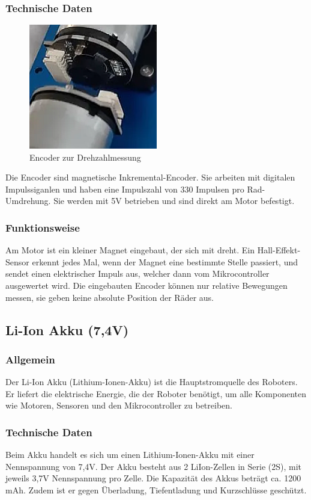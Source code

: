 \subsubsection{Technische Daten}
\begin{figure}[H]
    \centering
    \includegraphics[width=0.5\textwidth]{img/Hardware/encoder.png}
    \caption{Encoder zur Drehzahlmessung}
    \label{fig:encoder}
\end{figure}
Die Encoder sind magnetische Inkremental-Encoder.
Sie arbeiten mit digitalen Impulssiganlen und haben eine Impulszahl von 330 Impulsen pro Rad-Umdrehung.
%
Sie werden mit 5V betrieben und sind direkt am Motor befestigt.
\subsubsection{Funktionsweise}
Am Motor ist ein kleiner Magnet eingebaut,
der sich mit dreht.
%
Ein Hall-Effekt-Sensor erkennt jedes Mal,
wenn der Magnet eine bestimmte Stelle passiert,
und sendet einen elektrischer Impuls aus,
welcher dann vom Mikrocontroller ausgewertet wird.
%
Die eingebauten Encoder können nur relative Bewegungen messen,
sie geben keine absolute Position der Räder aus.
%
\subsection{Li-Ion Akku (7,4V)}
%
\subsubsection{Allgemein}
Der Li-Ion Akku (Lithium-Ionen-Akku) ist die Hauptstromquelle des Roboters.
% 
Er liefert die elektrische Energie, die der Roboter benötigt,
um alle Komponenten wie Motoren, Sensoren und den Mikrocontroller zu betreiben.
%
\subsubsection{Technische Daten}
Beim Akku handelt es sich um einen Lithium-Ionen-Akku mit einer Nennspannung von 7,4V.
%
Der Akku besteht aus 2 LiIon-Zellen in Serie (2S), mit jeweils 3,7V Nennspannung pro Zelle.
Die Kapazität des Akkus beträgt ca. 1200 mAh.
%
Zudem ist er gegen Überladung, Tiefentladung und Kurzschlüsse geschützt.
%

